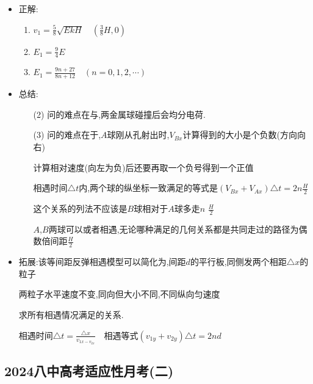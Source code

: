 \documentclass{article}
\begin{document}
\begin{itemize}
    \item 正解:
          \begin{enumerate}[label = (\arabic*)]
              \item $v_{1} = \frac{5}{8} \sqrt{EkH} \quad (\frac{3}{8}H,0)$
              \item $E_{1} = \frac{9}{4}E$
              \item $E_{1} = \frac{9n+27}{8n+12} \quad (n = 0,1,2,\cdots)$
          \end{enumerate}
    \item 总结:
          \begin{itemize}
              \item[(2)]问的难点在与,两金属球碰撞后会均分电荷.
              \item[(3)]问的难点在于,$A$球刚从孔射出时,$V_{Bx}$计算得到的大小是个负数(方向向右)

              计算相对速度(向左为负)后还要再取一个负号得到一个正值

              相遇时间$\triangle t$内,两个球的纵坐标一致满足的等式是$(V_{Bx}+V_{Ax})\triangle t = 2n \frac{H}{2}$

              这个关系的列法不应该是$B$球相对于$A$球多走$n$ $\frac{H}{2}$

              $A$,$B$两球可以或者相遇,无论哪种满足的几何关系都是共同走过的路径为偶数倍间距$\frac{H}{2}$
          \end{itemize}
    \item 拓展:\quad 该等间距反弹相遇模型可以简化为,间距$d$的平行板,同侧发两个相距$\triangle x$的粒子

          \hspace{3.4em}两粒子水平速度不变,同向但大小不同,不同纵向匀速度

          \hspace{3.4em}求所有相遇情况满足的关系.

          \hspace{3.4em}相遇时间$\triangle t = \frac{\triangle x}{v_{1x - v_{2x}}} \quad $相遇等式$(v_{1y}+v_{2y}) \triangle t = 2n d$

\end{itemize}

\vspace{2em}

\subsection{2024八中高考适应性月考(二)}
\end{document}

